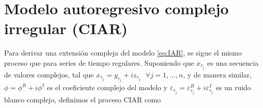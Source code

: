 




\section{Modelo autoregresivo complejo irregular (CIAR)}
\label{section:CIAR}

Para derivar una extensión compleja del modelo \ref{eq:IAR}, se sigue el mismo proceso que para series de tiempo regulares. Suponiendo que $x_{\tau_{j}}$ es una secuencia de valores complejos, 
tal que $x_{\tau_{j}}=y_{\tau_{j}}+i z_{\tau_{j}} \text{ } \forall j=1, \ldots, n$, y de manera similar, $\phi=\phi^{R}+i \phi^{I}$ es el coeficiente complejo del modelo 
y $\varepsilon_{\tau_{j}}=\varepsilon_{\tau_{j}}^{R}+i \varepsilon_{\tau_{j}}^{I}$ es un ruido blanco complejo, definimos el proceso CIAR como

